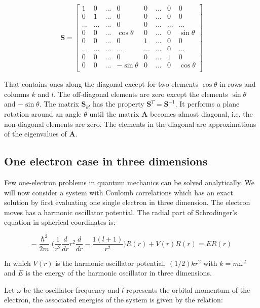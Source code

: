 \documentclass{article}
\begin{document}
\[
\textbf{S} = 
\begin{bmatrix}
    1 & 0 & ... & 0 & 0 & ... & 0 & 0 \\
    0 & 1 & ... & 0 & 0 & ... & 0 & 0 \\
    ... & ... & ... & 0 & 0 & ... & ... & ... \\
    0 & 0 & ... & \cos\theta & 0 & ... & 0 & \sin\theta \\
    0 & 0 & ... & 0 & 1 & ... & 0 & 0 \\
    ... & ... & ... & ... & ... & ... & 0 & ... \\
    0 & 0 & ... & 0 & 0 & ... & 1 & 0 \\
    0 & 0 & ... & -\sin\theta & 0 & ... & 0 & \cos\theta \\
\end{bmatrix}
\]

That contains ones along the diagonal except for two elements $\cos\theta$ in rows and columns $k$ and $l$. The off-diagonal elements are zero except the elements $\sin\theta$ and $-\sin\theta$. The matrix  $\textbf{S}_{kl}$ has the property $\textbf{S}^T = \textbf{S}^{-1}$. It performs a plane rotation around an angle $\theta$ until the matrix $\textbf{A}$ becomes almost diagonal, i.e. the non-diagonal elements are zero. The elements in the diagonal are approximations of the eigenvalues of $\textbf{A}$.

\subsection{One electron case in three dimensions}
Few one-electron problems in quantum mechanics can be solved analytically. We will now consider a system with Coulomb correlations which has an exact solution by first evaluating one single electron in three dimension. The electron moves has a harmonic oscillator potential. The radial part of Schrodinger's equation in spherical coordinates is: 

\begin{equation}
    -\frac{\hslash^2}{2m}\Big(\frac{1}{r^2}\frac{d}{dr}r^2\frac{d}{dr}-\frac{1(l+1)}{r^2}\Big)R(r) + V(r)R(r) = ER(r)
    \label{eq:schr}
\end{equation}

In which $V(r)$ is the harmonic oscillator potential, $(1/2)kr^2$ with $k = m\omega^2$ and $E$ is the energy of the harmonic oscillator in three dimensions.

\medskip

Let $\omega$ be the oscillator frequency and $l$ represents the orbital momentum of the electron, the associated energies of the system is given by the relation: 
\end{document}
